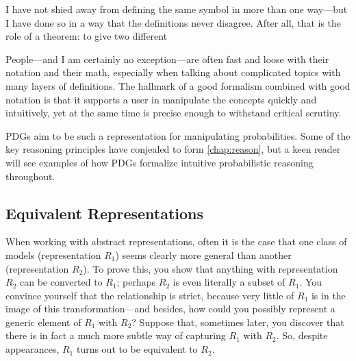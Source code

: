 I have not shied away from defining the same symbol in more than one way---but I have done so in a way that the definitions never disagree.
After all, that is the role of a theorem: to give two different 


\TODO


People---and I am certainly no exception---are often fast and loose with their notation and their math, especially when talking about complicated topics with many layers of definitions. 
%
The hallmark of a good formalism combined with good notation is that it supports a user in manipulate the concepts quickly and intuitively, yet at the same time is precise enough to withstand critical scrutiny.
    

PDGs aim to be such a representation for manipulating probabilities.
Some of the key reasoning principles have conjealed to form \cref{chap:reason},
but a keen reader will see examples of how PDGs formalize intuitive probabilistic reasoning throughout. 


%
\subsection{Equivalent Representations}

When working with abstract representations, often it is the case that one class of models (representation $R_1$) seems clearly more general than another (representation $R_2$).
To prove this, you show that anything with representation $R_2$ can be converted to $R_1$; perhaps $R_2$ is even literally a subset of $R_1$. 
You convince yourself that the relationship is strict, because very little of $R_1$ is in the image of this transformation---and besides, how could you possibly represent a generic element of $R_1$ with $R_2$? 
Suppose that, sometimes later,
 you discover that there is in fact a much more subtle way of capturing $R_1$ with $R_2$. 
So, despite appearances, $R_1$ turns out to be equivalent to $R_2$. 

